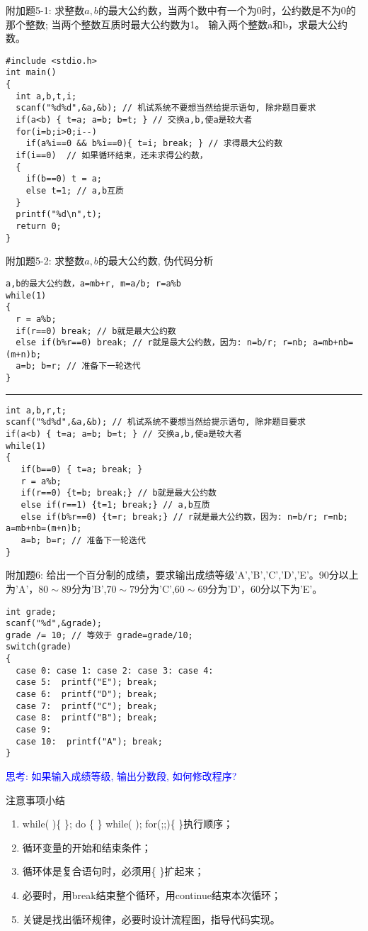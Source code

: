 \begin{frame}
附加题5-1: 求整数$a,b$的最大公约数，当两个数中有一个为0时，公约数是不为0的那个整数; 当两个整数互质时最大公约数为1。
输入两个整数a和b，求最大公约数。 
\pause
\begin{lstlisting}
#include <stdio.h>
int main()
{
  int a,b,t,i;
  scanf("%d%d",&a,&b); // 机试系统不要想当然给提示语句, 除非题目要求 
  if(a<b) { t=a; a=b; b=t; } // 交换a,b,使a是较大者 
  for(i=b;i>0;i--)
    if(a%i==0 && b%i==0){ t=i; break; } // 求得最大公约数 
  if(i==0)  // 如果循环结束，还未求得公约数，
  {
    if(b==0) t = a;
    else t=1; // a,b互质 
  } 
  printf("%d\n",t);
  return 0;
}
\end{lstlisting}
\end{frame}

\begin{frame}
附加题5-2: 求整数$a,b$的最大公约数, 伪代码分析
\begin{lstlisting}
a,b的最大公约数，a=mb+r, m=a/b; r=a%b
while(1)
{
  r = a%b; 
  if(r==0) break; // b就是最大公约数
  else if(b%r==0) break; // r就是最大公约数，因为: n=b/r; r=nb; a=mb+nb=(m+n)b;
  a=b; b=r; // 准备下一轮迭代   
}
\end{lstlisting}
\rule{\textwidth}{1pt} %
\pause
\begin{lstlisting}
int a,b,r,t;
scanf("%d%d",&a,&b); // 机试系统不要想当然给提示语句, 除非题目要求
if(a<b) { t=a; a=b; b=t; } // 交换a,b,使a是较大者
while(1)
{
   if(b==0) { t=a; break; }
   r = a%b; 
   if(r==0) {t=b; break;} // b就是最大公约数
   else if(r==1) {t=1; break;} // a,b互质 
   else if(b%r==0) {t=r; break;} // r就是最大公约数，因为: n=b/r; r=nb; a=mb+nb=(m+n)b;
   a=b; b=r; // 准备下一轮迭代   
}
\end{lstlisting}
\end{frame}

\begin{frame}
附加题6: 给出一个百分制的成绩，要求输出成绩等级'A','B','C','D','E'。90分以上为'A'，$80\sim 89$分为'B',$70\sim 79$分为'C',$60\sim 69$分为'D'，60分以下为'E'。
\begin{lstlisting}
int grade;
scanf("%d",&grade);
grade /= 10; // 等效于 grade=grade/10;
switch(grade)
{
  case 0: case 1: case 2: case 3: case 4: 
  case 5:  printf("E"); break;
  case 6:  printf("D"); break;
  case 7:  printf("C"); break;
  case 8:  printf("B"); break;
  case 9:
  case 10:  printf("A"); break;
}
\end{lstlisting}
\pause
\textcolor{blue}{思考: 如果输入成绩等级, 输出分数段, 如何修改程序? }
\end{frame}

\begin{frame}{注意事项小结}
\begin{enumerate}
\setlength{\itemsep}{.5cm}
\item while( )\{ \}; do \{ \} while( ); for(;;)\{ \}执行顺序；
\item 循环变量的开始和结束条件；
\item 循环体是复合语句时，必须用\{ \}扩起来；
\item 必要时，用break结束整个循环，用continue结束本次循环；
\item 关键是找出循环规律，必要时设计流程图，指导代码实现。	
\end{enumerate}
\end{frame}